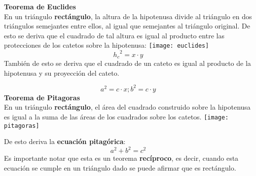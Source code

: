 \textbf{Teorema de Euclides}\\
En un triángulo \textbf{rectángulo}, la altura de la hipotenusa divide al triángulo en dos triángulos semejantes entre ellos, al igual que semejantes al triángulo original. De esto se deriva que el cuadrado de tal altura es igual al producto entre las protecciones de los catetos sobre la hipotenusa:
\texttt{[image: euclides]}
\begin{equation*}
{h_c}^2 = x \cdot y
\end{equation*}
También de esto se deriva que el cuadrado de un cateto es igual al producto de la hipotenusa y su proyección del cateto.

\begin{equation*}
    a^2 = c \cdot x; b^2 = c \cdot y
\end{equation*}
\textbf{Teorema de Pitagoras}\\
En un triángulo \textbf{rectángulo}, el área del cuadrado construido sobre la hipotenusa es igual a la suma de las áreas de los cuadrados sobre los catetos.
\texttt{[image: pitagoras]}

De esto deriva la \textbf{ecuación pitagórica}:
\begin{equation*}
    a^2 + b^2 = c^2
\end{equation*}
Es importante notar que esta es un teorema \textbf{recíproco}, es decir, cuando esta ecuación se cumple en un triángulo dado se puede afirmar que es rectángulo.\\
